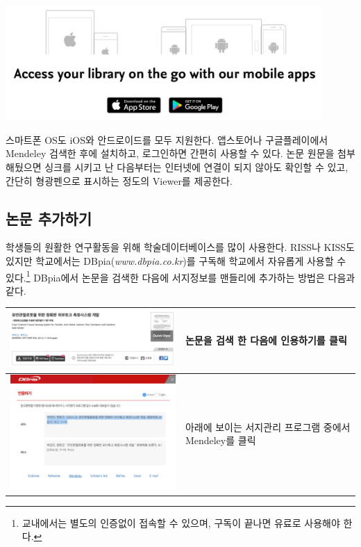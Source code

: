 \documentclass[11pt]{article}
\begin{document}
\begin{center}
	\includegraphics[width=12cm]{./image/desktop8.png}
\end{center}
스마트폰 OS도 iOS와 안드로이드를 모두 지원한다. 앱스토어나 구글플레이에서 \textrm{Mendeley} 검색한 후에 설치하고, 로그인하면 간편히 사용할 수 있다. 논문 원문을 첨부해뒀으면 싱크를 시키고 난 다음부터는 인터넷에 연결이 되지 않아도 확인할 수 있고, 간단히 형광펜으로 표시하는 정도의 Viewer를 제공한다.

\subsection{논문 추가하기}
학생들의 원활한 연구활동을 위해 학술데이터베이스를 많이 사용한다. RISS나 KISS도 있지만 학교에서는 DBpia(\textit{www.dbpia.co.kr})를 구독해 학교에서 자유롭게 사용할 수 있다.\footnote{교내에서는 별도의 인증없이 접속할 수 있으며, 구독이 끝나면 유료로 사용해야 한다.} DBpia에서 논문을 검색한 다음에 서지정보를 맨들리에 추가하는 방법은 다음과 같다. \\
\begin{tabular}{ m{11cm} m{50mm} }
	\hline
	\includegraphics[width=10cm]{./image/ris_import1.png} & 논문을 검색 한 다음에 \textrm{인용하기}를 클릭\\
	\hline
	\includegraphics[width=10cm]{./image/ris_import3.png} & 아래에 보이는 서지관리 프로그램 중에서 \textrm{Mendeley}를 클릭\\

	
\end{tabular}
\end{document}
